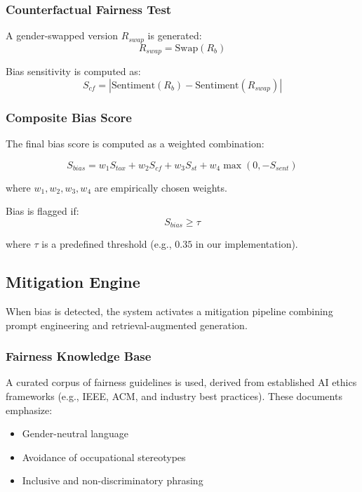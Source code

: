 \documentclass[conference]{IEEEtran}
\begin{document}
\subsubsection{Counterfactual Fairness Test}

A gender-swapped version $R_{swap}$ is generated:
\begin{equation}
R_{swap} = \text{Swap}(R_b)
\end{equation}

Bias sensitivity is computed as:
\begin{equation}
S_{cf} = | \text{Sentiment}(R_b) - \text{Sentiment}(R_{swap}) |
\end{equation}

\vspace{4pt}

\subsubsection{Composite Bias Score}

The final bias score is computed as a weighted combination:

\begin{equation}
S_{bias} = w_1 S_{tox} + w_2 S_{cf} + w_3 S_{st} + w_4 \max(0, -S_{sent})
\end{equation}

where $w_1, w_2, w_3, w_4$ are empirically chosen weights.

Bias is flagged if:
\begin{equation}
S_{bias} \geq \tau
\end{equation}

where $\tau$ is a predefined threshold (e.g., $0.35$ in our implementation).

\vspace{6pt}

\subsection{Mitigation Engine}

When bias is detected, the system activates a mitigation pipeline combining prompt engineering and retrieval-augmented generation.

\subsubsection{Fairness Knowledge Base}

A curated corpus of fairness guidelines is used, derived from established AI ethics frameworks (e.g., IEEE, ACM, and industry best practices). These documents emphasize:
\begin{itemize}
    \item Gender-neutral language
    \item Avoidance of occupational stereotypes
    \item Inclusive and non-discriminatory phrasing
\end{itemize}
\end{document}
